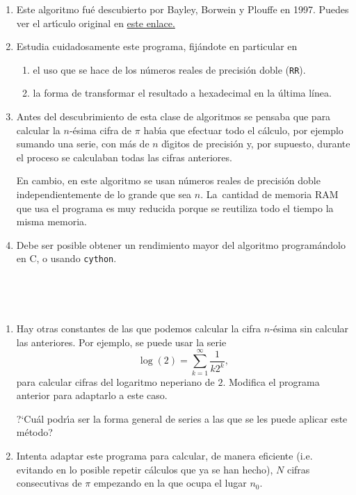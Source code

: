  \begin{enumerate}
  \item Este algoritmo fu\'e descubierto por Bayley, Borwein y Plouffe en 1997.
Puedes ver el art\'{\i}culo original en
\href{http://150.244.21.37/PDFs/APROX/digits-BBP.pdf}{este enlace.}
  
  \item Estudia cuidadosamente este programa, fij\'andote en particular en 
  \begin{enumerate}
  \item el uso que se hace de los n\'umeros reales de precisi\'on doble ({\tt RR}). 
  \item la forma de transformar el resultado a hexadecimal en la \'ultima
l\'inea. 
  \end{enumerate}
\item Antes del descubrimiento de esta clase de algoritmos se pensaba que para
calcular la $n$-\'esima cifra de $\pi$ hab\'{\i}a que efectuar todo el
c\'alculo, por ejemplo sumando una serie,  con m\'as de $n$ d\'{\i}gitos de
precisi\'on y, por supuesto, durante el proceso se calculaban todas las cifras
anteriores. 

En cambio, en este algoritmo se usan n\'umeros reales de precisi\'on doble
independientemente de lo grande que sea $n$. La~cantidad de memoria RAM que usa
el programa es 
muy reducida porque se reutiliza todo el tiempo la misma memoria.

\item Debe ser  posible obtener un rendimiento  mayor del algoritmo
pro\-gra\-m\'an\-do\-lo en C, o usando \lstinline|cython|.

\end{enumerate}
 
\
 
 \bigskip
 
 \
 
 
\begin{ejer}

\begin{enumerate}
 \item Hay otras constantes de las que podemos calcular la cifra $n$-\'esima sin
calcular las anteriores. Por ejemplo, se puede usar la serie
 \[\log(2)=\sum_{k=1}^{\infty} \frac{1}{k2^k},\]
 para calcular cifras del logaritmo neperiano de $2$. Modifica el programa
anterior para adaptarlo a este caso.
 
 ?`Cu\'al podr\'{\i}a ser la forma general de series a las que se les puede
aplicar este m\'etodo?
 
 \item Intenta adaptar este programa para calcular, de manera eficiente (i.e.
evitando en lo posible repetir c\'alculos que ya se han hecho),  
 $N$ cifras consecutivas de $\pi$ empezando en la que ocupa el lugar $n_0$. 
 \end{enumerate}
\end{ejer}



